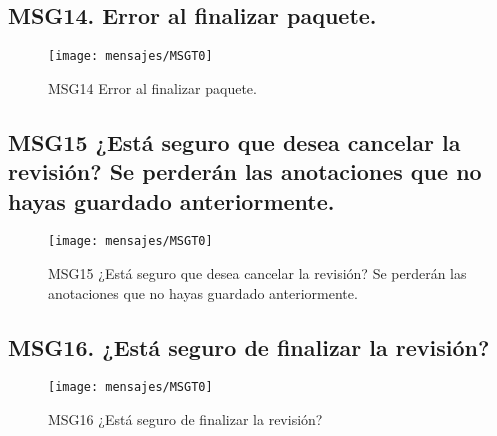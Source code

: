 \subsection{MSG14. Error al finalizar paquete.}
    \begin{figure}[htbp]
        \begin{center}
            \texttt{[image: mensajes/MSGT0]}
            \caption{MSG14 Error al finalizar paquete.}
            \label{fig:MSG14}
        \end{center}
    \end{figure}

\subsection{MSG15 ¿Está seguro que desea cancelar la revisión? Se perderán las anotaciones que no hayas guardado anteriormente.}
    \begin{figure}[htbp]
        \begin{center}
            \texttt{[image: mensajes/MSGT0]}
            \caption{MSG15 ¿Está seguro que desea cancelar la revisión? Se perderán las anotaciones que no hayas guardado anteriormente.}
            \label{fig:MSG15}
        \end{center}
    \end{figure}

\subsection{MSG16. ¿Está seguro de finalizar la revisión?}
    \begin{figure}[htbp]
        \begin{center}
            \texttt{[image: mensajes/MSGT0]}
            \caption{MSG16 ¿Está seguro de finalizar la revisión?}
            \label{fig:MSG16}
        \end{center}
    \end{figure}

